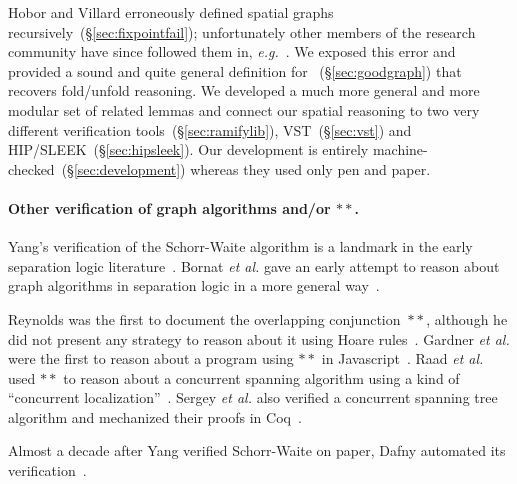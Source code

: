 Hobor and Villard erroneously defined spatial graphs 
recursively~(\S\ref{sec:fixpointfail}); unfortunately other members of the research 
community have since followed them in, \emph{e.g.}~\cite{raadvg15}.  We exposed this 
error and provided a sound and quite general definition for 
~(\S\ref{sec:goodgraph}) that recovers fold/unfold reasoning.  We developed a 
much more general and more modular set of related lemmas and connect our spatial 
reasoning to two very different verification tools~(\S\ref{sec:ramifylib}), 
VST~(\S\ref{sec:vst}) and HIP/SLEEK~(\S\ref{sec:hipsleek}).  Our development is entirely 
machine-checked~(\S\ref{sec:development}) whereas they used only pen and paper.
\fi

\paragraph{Other verification of graph algorithms and/or $**$.}
Yang's verification of the Schorr-Waite algorithm is a landmark in the early separation 
logic literature~\cite{hongseok:phd}.  Bornat \emph{et al.} gave an early attempt to 
reason about graph algorithms in separation logic in a more general 
way~\cite{bornat:aliasing04}.

Reynolds was the first to document the overlapping conjunction~$**$, although he did not 
present any strategy to reason about it using Hoare rules~\cite{rey-slnotes}.  
Gardner \emph{et al.} were the first to reason about a program using $**$ in 
Javascript~\cite{gardnerms12}.  Raad \emph{et al.} used $**$ to reason about a 
concurrent spanning algorithm using a kind of 
``concurrent localization''~\cite{raadvg15}.  Sergey \emph{et al.} also verified a 
concurrent spanning tree algorithm and mechanized their proofs in Coq~\cite{ilya-graphs}.

Almost a decade after Yang verified Schorr-Waite on paper, Dafny automated 
its verification~\cite{leino10}.



